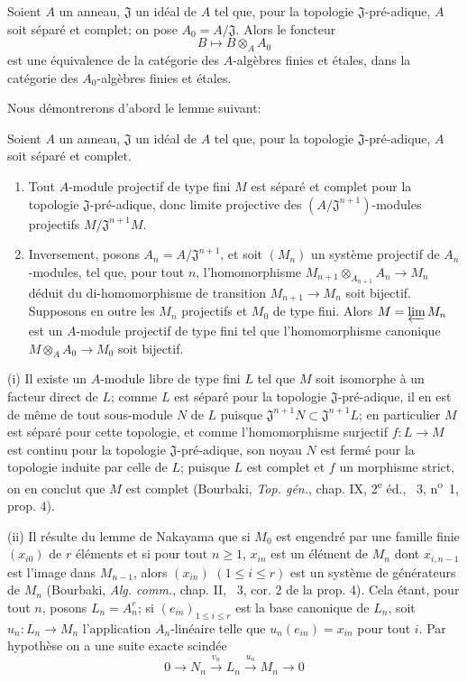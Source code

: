 \begin{proposition}[18.3.2]
\label{IV.18.3.2}
Soient $A$ un anneau, $\mathfrak J$ un idéal de $A$ tel que, pour la topologie $\mathfrak J$-pré-adique, $A$ soit séparé et complet; on pose $A_0=A/\mathfrak J$. Alors le foncteur
\[
  B\longmapsto B\otimes_A A_0
\]
est une équivalence de la catégorie des $A$-algèbres finies et étales, dans la catégorie des $A_0$-algèbres finies et étales.
\end{proposition}

Nous démontrerons d'abord le lemme suivant:

\begin{lemma}[18.3.2.1]
\label{IV.18.3.2.1}
Soient $A$ un anneau, $\mathfrak J$ un idéal de $A$ tel que, pour la topologie $\mathfrak J$-pré-adique, $A$ soit séparé et complet.
\begin{enumerate}
  \item[(i)] Tout $A$-module projectif de type fini $M$ est séparé et complet pour la topologie $\mathfrak J$-pré-adique, donc limite projective des $(A/\mathfrak J^{n+1})$-modules projectifs $M/\mathfrak J^{n+1}M$.
  \item[(ii)] Inversement, posons $A_n=A/\mathfrak J^{n+1}$, et soit $(M_n)$ un système projectif de $A_n$-modules, tel que, pour tout $n$, l'homomorphisme $M_{n+1}\otimes_{A_{n+1}}A_n\to M_n$ déduit du di-homomorphisme de transition $M_{n+1}\to M_n$ soit bijectif. Supposons en outre les $M_n$ projectifs et $M_0$ de type fini. Alors $M=\varprojlim M_n$ est un $A$-module projectif de type fini tel que l'homomorphisme canonique $M\otimes_A A_0\to M_0$ soit bijectif.
\end{enumerate}
\end{lemma}

(i) Il existe un $A$-module libre de type fini $L$ tel que $M$ soit isomorphe à un facteur direct de $L$; comme $L$ est séparé pour la topologie $\mathfrak J$-pré-adique, il en est de même de tout sous-module $N$ de $L$ puisque $\mathfrak J^{n+1}N\subset\mathfrak J^{n+1}L$; en particulier $M$ est séparé pour cette topologie, et comme l'homomorphisme surjectif $f:L\to M$ est continu pour la topologie $\mathfrak J$-pré-adique, son noyau $N$ est fermé pour la topologie induite par celle de $L$; puisque $L$ est complet et $f$ un morphisme strict, on en conclut que $M$ est complet (Bourbaki, \emph{Top. gén.}, chap. IX, 2\textsuperscript{e} éd., \textsection~3, n\textsuperscript{o}~1, prop. 4).

(ii) Il résulte du lemme de Nakayama que si $M_0$ est engendré par une famille finie $(x_{i0})$ de $r$ éléments et si pour tout $n\geq 1$, $x_{in}$ est un élément de $M_n$ dont $x_{i,n-1}$ est l'image dans $M_{n-1}$, alors $(x_{in})$ $(1\leq i\leq r)$ est un système de générateurs de $M_n$ (Bourbaki, \emph{Alg. comm.}, chap. II, \textsection~3, cor. 2 de la prop. 4). Cela étant, pour tout $n$, posons $L_n=A_n^r$; si $(e_{in})_{1\leq i\leq r}$ est la base canonique de $L_n$, soit $u_n:L_n\to M_n$ l'application $A_n$-linéaire telle que $u_n(e_{in})=x_{in}$ pour tout $i$. Par hypothèse on a une suite exacte scindée
\[
  0\longrightarrow N_n\xrightarrow{v_n}L_n\xrightarrow{u_n}M_n\longrightarrow 0
\]

